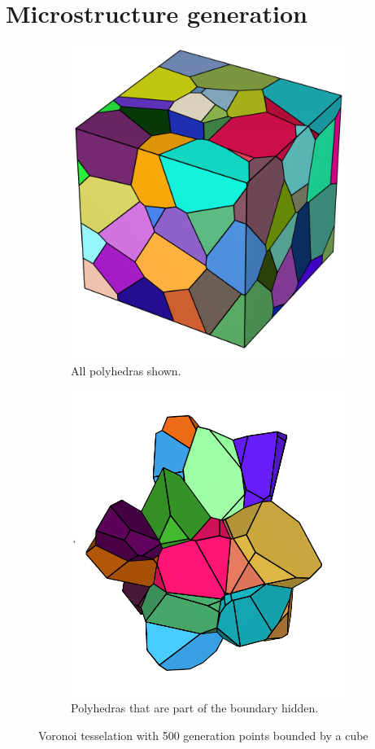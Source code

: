\documentclass[micro_gen.tex]{subfiles}
\begin{document}
\chapter{Microstructure generation}



\begin{figure}
\centering
\begin{subfigure}{.5\textwidth}
  \centering
  \includegraphics[width=.5\linewidth]{./figures/img_body.png}
  \caption{All polyhedras shown.}
  \label{fig:sub1}
\end{subfigure}%
\begin{subfigure}{.5\textwidth}
  \centering
  \includegraphics[width=.5\linewidth]{./figures/img_bodyno.png}
  \caption{Polyhedras that are part of the boundary hidden.}
  \label{fig:sub2}
\end{subfigure}
\caption{Voronoi tesselation with 500 generation points bounded by a cube}
\label{fig:test}
\end{figure}
\end{document}
